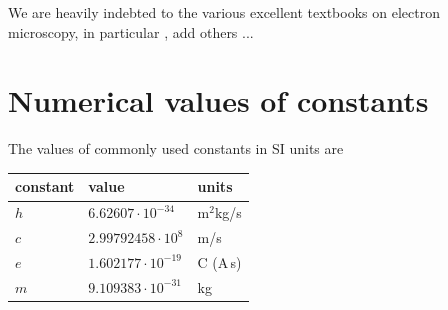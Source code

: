 \documentclass[%
 superscriptaddress,
 aip,
 amsmath,amssymb,
preprint,%
 author-year,%
longbibliography
]{revtex4-2}
\begin{document}
We are heavily indebted to the various excellent textbooks on electron microscopy, in particular \cite{kirkland2020}, add others ...   


% 



\appendix 
\section{Numerical values of constants}\label{app:constants}

The values of commonly used constants in SI units are
\begin{center}
\begin{tabular}{l l l} 
    \hline
    constant & value & units \\
    \hline
    $h$ & $6.62607 \cdot 10^{-34}$ & m$^2$kg/s   \\
    $c$ & $2.99792458 \cdot 10^{8}$ & m/s  \\ 
    $e$ & $1.602177 \cdot 10^{-19}$ & C (A$\,$s)  \\ 
    $m$ & $9.109383 \cdot 10^{-31}$ & kg  \\ 
    \hline
\end{tabular}
\end{center}
\end{document}
